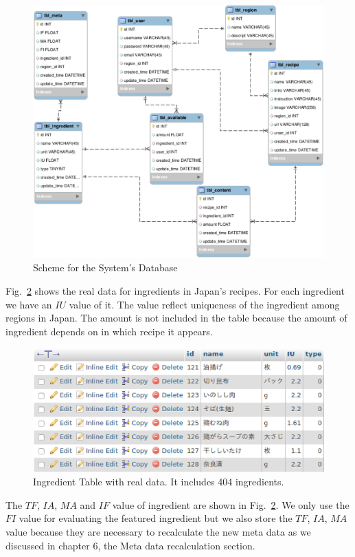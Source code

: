 \begin{figure}
\centering
\includegraphics[scale=0.5]{scheme.eps}
\caption{Scheme for the System's Database}
\label{fig:scheme}

\end{figure}

Fig.~\ref{fig:ingredient} shows the real data for ingredients in Japan's recipes. For each ingredient we have an $IU$ value of it. The value reflect uniqueness of the ingredient among regions in Japan. The amount is not included in the table because the amount of ingredient depends on in which recipe it appears.
 
\begin{figure}
\centering
\includegraphics[scale=0.5]{ingredient.eps}
\caption{Ingredient Table with real data. It includes 404 ingredients.}
\label{fig:ingredient}
\end{figure}

The $TF$, $IA$, $MA$ and $IF$ value of ingredient are shown in Fig.~\ref{fig:ingredient}. We only use the $FI$ value for evaluating the featured ingredient but we also store the $TF$, $IA$, $MA$ value because they are necessary to recalculate the new meta data as we discussed in chapter 6, the Meta data recalculation section.



